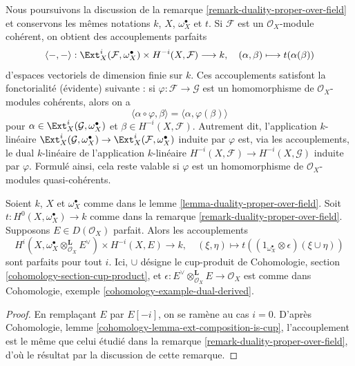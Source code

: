 \begin{remark}
\label{remark-coherent-duality-proper-over-field}
Nous poursuivons la discussion de la remarque \ref{remark-duality-proper-over-field} et conservons les mêmes notations $k$, $X$, $\omega_X^\bullet$ et $t$. Si $\mathcal{F}$ est un $\mathcal{O}_X$-module cohérent, on obtient des accouplements parfaits
$$
\langle -, - \rangle :
\Ext^i_X(\mathcal{F}, \omega_X^\bullet) \times H^{-i}(X,\mathcal{F})
\longrightarrow k,\quad
(\alpha, \beta) \longmapsto t(\alpha(\beta))
$$
d'espaces vectoriels de dimension finie sur $k$. Ces accouplements satisfont la fonctorialité (évidente) suivante : si $\varphi : \mathcal{F} \to \mathcal{G}$ est un homomorphisme de $\mathcal{O}_X$-modules cohérents, alors on a
$$
\langle \alpha \circ \varphi, \beta \rangle =
\langle \alpha, \varphi(\beta) \rangle
$$
pour $\alpha \in \Ext^i_X(\mathcal{G}, \omega_X^\bullet)$ et $\beta \in H^{-i}(X, \mathcal{F})$. Autrement dit, l'application $k$-linéaire $\Ext^i_X(\mathcal{G}, \omega_X^\bullet) \to
\Ext^i_X(\mathcal{F}, \omega_X^\bullet)$ induite par $\varphi$ est, via les accouplements, le dual $k$-linéaire de l'application $k$-linéaire $H^{-i}(X, \mathcal{F}) \to H^{-i}(X, \mathcal{G})$ induite par $\varphi$. Formulé ainsi, cela reste valable si $\varphi$ est un homomorphisme de $\mathcal{O}_X$-modules quasi-cohérents.
\end{remark}

\begin{lemma}
\label{lemma-duality-proper-over-field-perfect}
Soient $k$, $X$ et $\omega_X^\bullet$ comme dans le lemme \ref{lemma-duality-proper-over-field}. Soit $t : H^0(X, \omega_X^\bullet) \to k$ comme dans la remarque \ref{remark-duality-proper-over-field}. Supposons $E \in D(\mathcal{O}_X)$ parfait. Alors les accouplements
$$
H^i(X, \omega_X^\bullet \otimes_{\mathcal{O}_X}^\mathbf{L} E^\vee)
\times
H^{-i}(X, E) \longrightarrow k, \quad
(\xi, \eta) \longmapsto
t((1_{\omega_X^\bullet} \otimes \epsilon)(\xi \cup \eta))
$$
sont parfaits pour tout $i$. Ici, $\cup$ désigne le cup-produit de Cohomologie, section \ref{cohomology-section-cup-product}, et $\epsilon : E^\vee \otimes_{\mathcal{O}_X}^\mathbf{L} E \to \mathcal{O}_X$ est comme dans Cohomologie, exemple \ref{cohomology-example-dual-derived}.
\end{lemma}

\begin{proof}
En remplaçant $E$ par $E[-i]$, on se ramène au cas $i = 0$. D'après Cohomologie, lemme \ref{cohomology-lemma-ext-composition-is-cup}, l'accouplement est le même que celui étudié dans la remarque \ref{remark-duality-proper-over-field}, d'où le résultat par la discussion de cette remarque.
\end{proof}

